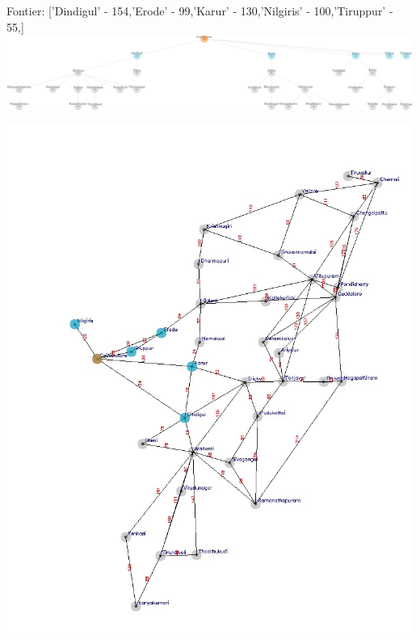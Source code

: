 \documentclass[xcolor=table]{beamer}
\begin{document}
\begin{frame}
  { \tiny Fontier: ['Dindigul' - 154,'Erode' - 99,'Karur' - 130,'Nilgiris' - 100,'Tiruppur' - 55,] }
  \includegraphics[width=1\textwidth]{../UCSNodes/3-1.png}
  \begin{center}
    \includegraphics[height=0.6\textheight]{../UCSoutput/tamilUCS1.jpg}
  \end{center}
\end{frame}
\end{document}
